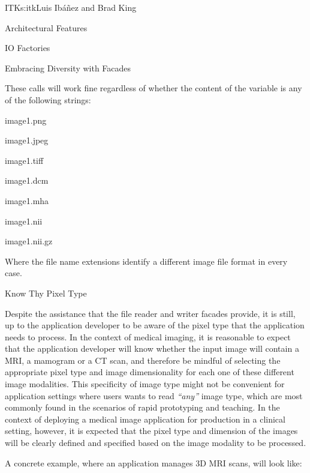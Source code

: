 \begin{aosachapter}{ITK}{s:itk}{Luis Ib\'{a}\~{n}ez and Brad King}
\begin{aosasect1}{Architectural Features}
\begin{aosasect2}{IO Factories}
\begin{aosasect3}{Embracing Diversity with Facades}
\begin{aosaitemize}
\item {}
\item {}
\item {}
\end{aosaitemize}

These calls will work fine regardless of whether the content of the
 variable is any of the following strings:

\begin{aosaitemize}
\item image1.png
\item image1.jpeg
\item image1.tiff
\item image1.dcm
\item image1.mha
\item image1.nii
\item image1.nii.gz
\end{aosaitemize}

Where the file name extensions identify a different image file
format in every case.

\end{aosasect3}

\begin{aosasect3}{Know Thy Pixel Type}

Despite the assistance that the file reader and writer facades provide, it is
still, up to the application developer to be aware of the pixel type that the
application needs to process. In the context of medical imaging, it is
reasonable to expect that the application developer will know whether the input
image will contain a MRI, a mamogram or a CT scan, and therefore be mindful of
selecting the appropriate pixel type and image dimensionality for each one of
these different image modalities. This specificity of image type might not be
convenient for application settings where users wants to read \emph{``any''}
image type, which are most commonly found in the scenarios of rapid prototyping
and teaching.  In the context of deploying a medical image application for
production in a clinical setting, however, it is expected that the pixel type
and dimension of the images will be clearly defined and specified based on the
image modality to be processed.

A concrete example, where an application manages 3D MRI scans, will look like:


\end{aosasect3}
\end{aosasect2}
\end{aosasect1}
\end{aosachapter}
